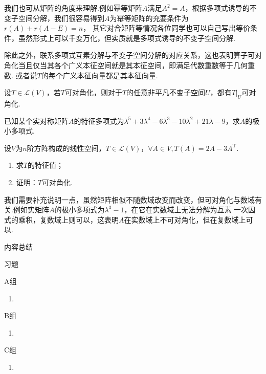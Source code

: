 我们也可从矩阵的角度来理解.例如幂等矩阵$A$满足$A^2=A$，根据多项式诱导的不变子空间分解，我们很容易得到$A$为幂等矩阵的充要条件为$r(A)+r(A-E)=n$，
其它对合矩阵等情况各位同学也可以自己写出等价条件，虽然形式上可以千变万化，但实质就是多项式诱导的不变子空间分解.

除此之外，联系多项式互素分解与不变子空间分解的对应关系，这也表明算子可对角化当且仅当其各个广义本征空间就是其本征空间，即满足代数重数等于几何重数.
或者说$T$的每个广义本征向量都是其本征向量.
\begin{example}
    设$T\in \mathcal{L}(V)$，若$T$可对角化，则对于$T$的任意非平凡不变子空间$U$，都有$T\vert_U$可对角化.
\end{example}
\begin{example}
    已知某个实对称矩阵$A$的特征多项式为$\lambda^5+3\lambda^4-6\lambda^3-10\lambda^2+21\lambda-9$，求$A$的极小多项式.
\end{example}
\begin{example}
    设$V$为$n$阶方阵构成的线性空间，$T\in \mathcal{L}(V)$，$\forall A\in V, T(A)=2A-3A^{\mathrm{T}}$.
    \begin{enumerate}
        \item 求$T$的特征值；

        \item 证明：$T$可对角化.
    \end{enumerate}
\end{example}
我们需要补充说明一点，虽然矩阵相似不随数域改变而改变，但可对角化与数域有关.例如实矩阵$A$的极小多项式为$\lambda^3-1$，在它在实数域上无法分解为互素
一次因式的乘积，复数域上则可以，这表明$A$在实数域上不可对角化，但在复数域上可以.

\vspace{2ex}
\centerline{\heiti \Large 内容总结}

\vspace{2ex}

\centerline{\heiti \Large 习题}
\vspace{2ex}
{\kaishu }
\begin{flushright}
    \kaishu

\end{flushright}
\centerline{\heiti A组}
\begin{enumerate}
    \item
\end{enumerate}
\centerline{\heiti B组}
\begin{enumerate}
    \item
\end{enumerate}
\centerline{\heiti C组}
\begin{enumerate}
    \item
\end{enumerate}
